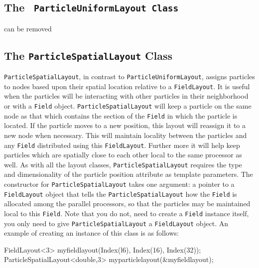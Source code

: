 \subsection{The \texttt{{\color{red} ParticleUniformLayout} Class}}
{\color{red} can be removed}

\subsection{The \texttt{ParticleSpatialLayout} Class}

\texttt{ParticleSpatialLayout}, in contrast to \texttt{ParticleUniformLayout}, assigns particles to nodes based upon their spatial location relative to a \texttt{FieldLayout}. It is useful when the particles will be interacting with other particles in their neighborhood or with a \texttt{Field} object. \texttt{ParticleSpatialLayout} will keep a particle on the same node as that which contains the section of the \texttt{Field} in which the particle is located. If the particle moves to a new position, this layout will reassign it to a new node when necessary. This will maintain locality between the particles and any \texttt{Field} distributed using this \texttt{FieldLayout}. Further more it will help keep particles which are spatially close to each other local to the same processor as well. As with all the layout classes, \texttt{ParticleSpatialLayout} requires the type and dimensionality of the particle position attribute as template parameters. The constructor for \texttt{ParticleSpatialLayout} takes one argument: a pointer to a \texttt{FieldLayout} object that tells the \texttt{ParticleSpatialLayout} how the \texttt{Field} is allocated among the parallel processors, so that the particles may be maintained local to this \texttt{Field}. Note that you do not, need to create a \texttt{Field} instance itself, you only need to give \texttt{ParticleSpatialLayout} a \texttt{FieldLayout} object. An example of creating an instance of this class is as follows:
\begin{smallcode}
FieldLayout<3> myfieldlayout(Index(l6), Index(16), Index(32)); 
ParticleSpatialLayout<double,3> myparticlelayout(&myfieldlayout);
\end{smallcode}


